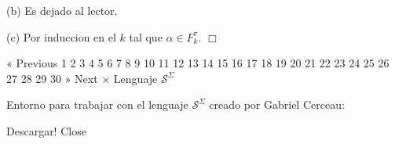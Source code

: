 (b) Es dejado al lector.

(c) Por induccion en el \(k\) tal que \(\alpha \in F_{k}^{\tau }\). \(\Box\)

« Previous
1
2
3
4
5
6
7
8
9
10
11
12
13
14
15
16
17
18
19
20
21
22
23
24
25
26
27
28
29
30
» Next
×
Lenguaje \(\mathcal{S}^{\Sigma }\)

Entorno para trabajar con el lenguaje \(\mathcal{S}^{\Sigma }\) creado por Gabriel Cerceau:

Descargar!
Close
